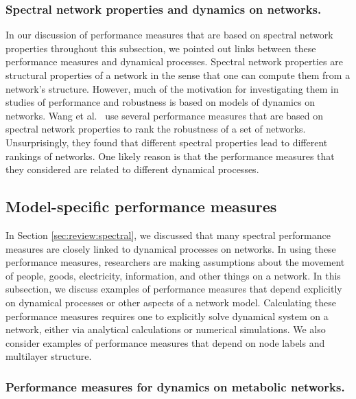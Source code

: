 \documentclass{comnet-mod}
\begin{document}
\subsubsection{Spectral network properties and dynamics on networks.}

In our discussion of performance measures that are based on spectral network properties throughout this subsection, we pointed out links between these performance measures and dynamical processes. Spectral network properties are structural properties of a network in the sense that one can compute them from a network's structure. However, much of the motivation for investigating them in studies of performance and robustness is based on models of dynamics on networks. Wang et al.~\cite{Wang2018} use several performance measures that are based on spectral network properties to rank the robustness of a set of networks. Unsurprisingly, they found that different spectral properties lead to different rankings of networks. One likely reason is that the performance measures that they considered are related to different dynamical processes.



\subsection{Model-specific performance measures}\label{sec:model_specific_performance}

In Section \ref{sec:review:spectral}, we discussed that many spectral performance measures are closely linked to dynamical processes on networks. In using these performance measures, researchers are making assumptions  about the movement of people, goods, electricity, information, and other things on a network. In this subsection, we discuss examples of performance measures that depend explicitly on dynamical processes or other aspects of a network model. Calculating these performance measures requires one to explicitly solve dynamical system on a network, either via analytical calculations or numerical simulations.  We also consider examples of performance measures that depend on node labels and multilayer structure.


\subsubsection{Performance measures for dynamics on metabolic networks.}\label{sec:review:specific}
\end{document}
